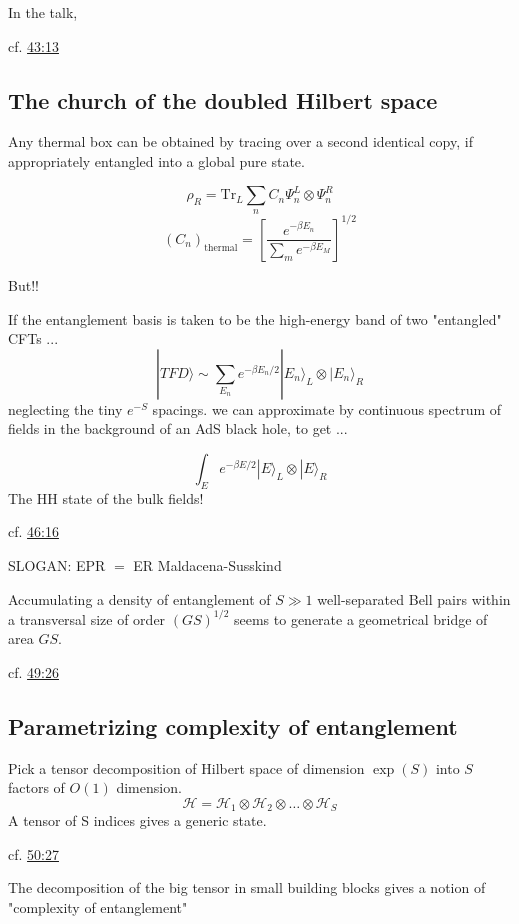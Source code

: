 \documentclass[10pt]{amsart}
\begin{document}
\begin{multicols*}{2}
In the talk, 


cf. \href{https://youtu.be/nsxgAOAEgbg?t=43m13s}{43:13}  

\subsection*{The church of the doubled Hilbert space}
 
Any thermal box can be obtained by tracing over a second identical copy, if appropriately entangled into a global pure state.  

\[
\rho_R = \text{Tr}_L \sum_n C_n \Psi_n^L \otimes \Psi_n^R
\]
\[
(C_n)_{\text{thermal}} = \left[ \frac{ e^{-\beta E_n} }{ \sum_m e^{-\beta E_M} } \right]^{1/2}
\]

But!!

If the entanglement basis is taken to be the high-energy band of two "entangled" CFTs ... 
\[
|TFD \rangle \sim \sum_{E_n} e^{-\beta E_n/2} | E_n \rangle_L \otimes | E_n \rangle_R
\]
neglecting the tiny $e^{-S}$ spacings. we can approximate by continuous spectrum of fields in the background of an AdS black hole, to get ... 
 
\[
\int_E e^{-\beta E/2} |E\rangle_L \otimes | E\rangle_R 
\]
The HH state of the bulk fields!  

cf. \href{https://youtu.be/nsxgAOAEgbg?t=46m16s}{46:16}

SLOGAN: EPR $=$ ER
Maldacena-Susskind  

Accumulating a density of entanglement of $S \gg 1$ well-separated Bell pairs within a transversal size of order $(GS)^{1/2}$  seems to generate a geometrical bridge of area $GS$.  



cf. \href{https://youtu.be/nsxgAOAEgbg?t=49m26s}{49:26}  

\subsection*{Parametrizing complexity of entanglement}

Pick a tensor decomposition of Hilbert space of dimension $\exp{(S)}$ into $S$ factors of $O(1)$ dimension.  
\[
\mathcal{H} = \mathcal{H}_1 \otimes \mathcal{H}_2 \otimes \dots \otimes \mathcal{H}_S
\]
A tensor of S indices gives a generic state.  

cf. \href{https://youtu.be/nsxgAOAEgbg?t=50m27s}{50:27}  

The decomposition of the big tensor in small building blocks gives a notion of "complexity of entanglement"  


\end{multicols*}
\end{document}
